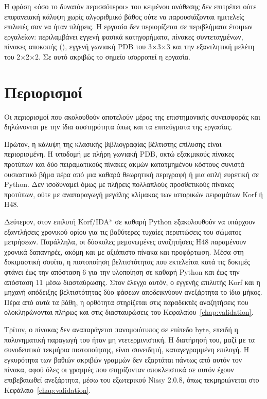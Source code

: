 Η φράση «όσο το δυνατόν περισσότεροι» του κειμένου ανάθεσης δεν επιτρέπει ούτε επιφανειακή κάλυψη χωρίς αλγοριθμικό βάθος ούτε να παρουσιάζονται ημιτελείς επιλυτές σαν να ήταν πλήρεις. Η εργασία δεν περιορίζεται σε περιβλήματα έτοιμων εργαλείων: περιλαμβάνει εγγενή φασικά κατηγορήματα, πίνακες συντεταγμένων, πίνακες αποκοπής (), εγγενή γωνιακή PDB του 3×3×3 και την εξαντλητική μελέτη του 2×2×2. Σε αυτό ακριβώς το σημείο ισορροπεί η εργασία.

\section{Περιορισμοί}
\label{sec:conclusions-limitations}

Οι περιορισμοί που ακολουθούν αποτελούν μέρος της επιστημονικής συνεισφοράς και δηλώνονται με την ίδια αυστηρότητα όπως και τα επιτεύγματα της εργασίας.

Πρώτον, η κάλυψη της κλασικής βιβλιογραφίας βέλτιστης επίλυσης είναι περιορισμένη. Η υποδομή με πλήρη γωνιακή PDB, οκτώ εξακμικούς πίνακες προτύπων και δύο πειραματικούς πίνακες ακμών κατατμημένου κόστους συνιστά ουσιαστικό βήμα πέρα από μια καθαρά θεωρητική περιγραφή ή μια απλή ευρετική σε Python. Δεν ισοδυναμεί όμως με πλήρεις πολλαπλούς προσθετικούς πίνακες προτύπων, ούτε με αναπαραγωγή μεγάλης κλίμακας των ιστορικών πειραμάτων Korf ή H48.

Δεύτερον, στον επιλυτή Korf/IDA* σε καθαρή Python εξακολουθούν να υπάρχουν εξαντλήσεις χρονικού ορίου για τις βαθύτερες τυχαίες περιπτώσεις του σώματος μετρήσεων. Παράλληλα, οι δύσκολες μεμονωμένες αναζητήσεις H48 παραμένουν χρονικά δαπανηρές, ακόμη και με αξιόπιστο πίνακα και προφόρτωση. Μέσα στη δοκιμαστική σουίτα, η πιστοποίηση βελτιστότητας που εκτελείται κατά τις δοκιμές φτάνει έως την απόσταση 6 για την υλοποίηση σε καθαρή Python και έως την απόσταση 11 μέσω διασταύρωσης. Στον έλεγχο αυτόν, ο εγγενής επιλυτής Korf και η μηχανή απόδειξης βελτιστότητας δύο φάσεων αποδεικνύουν ανεξάρτητα το ίδιο μήκος. Πέρα από αυτά τα βάθη, η ορθότητα στηρίζεται στις παραδεκτές αναζητήσεις που ολοκληρώνονται πλήρως και στις διασταυρώσεις του Κεφαλαίου~\ref{chap:validation}.

Τρίτον, ο πίνακας  δεν αναπαράγεται πανομοιότυπος σε επίπεδο byte, επειδή η πολυνηματική παραγωγή του ήταν μη ντετερμινιστική. Η διατήρησή του, μαζί με τα συνοδευτικά τεκμήρια πιστοποίησης, είναι συνειδητή, καταγεγραμμένη επιλογή. Η εγκυρότητα των βαθιών ακριβών γραμμών δεν εξαρτάται πάντως από αυτόν τον πίνακα, αφού όλες οι γραμμές που στηρίζονταν αποκλειστικά σε αυτόν έχουν επιβεβαιωθεί ανεξάρτητα, μέσω του εξωτερικού Nissy 2.0.8, όπως τεκμηριώνεται στο Κεφάλαιο~\ref{chap:validation}.


